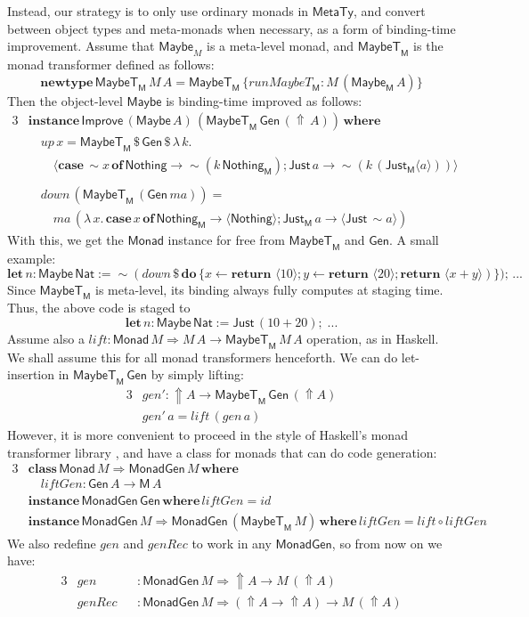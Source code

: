 \documentclass[acmsmall,screen,review,anonymous]{acmart}
\newcommand{\mit}[1]{\mathit{#1}}
\newcommand{\msf}[1]{\mathsf{#1}}
\newcommand{\mbf}[1]{\mathbf{#1}}
\newcommand{\bs}[1]{\boldsymbol{#1}}
\newcommand{\mdo}{\mbf{do}\,}
\newcommand{\ind}{\hspace{1em}}
\newcommand{\return}{\mbf{return}\,}
\newcommand{\lam}{\lambda\,}
\newcommand{\where}{\mbf{where}}
\newcommand{\M}{\msf{M}}
\newcommand{\of}{\mbf{of}\,}
\newcommand{\letdef}{\mbf{let\,}}
\newcommand{\vma}{\mit{ma}}
\newcommand{\Monad}{\msf{Monad}}
\newcommand{\fro}{\leftarrow}
\newcommand{\case}{\mbf{case\,}}
\newcommand{\Up}{{\Uparrow}}
\newcommand{\spl}{{\bs{\sim}}}
\newcommand{\ql}{{\bs{\langle}}}
\newcommand{\qr}{{\bs{\rangle}}}
\newcommand{\MTy}{\msf{MetaTy}}
\newcommand{\Nat}{\msf{Nat}}
\newcommand{\Maybe}{\msf{Maybe}}
\newcommand{\MaybeT}{\msf{MaybeT}}
\newcommand{\Nothing}{\msf{Nothing}}
\newcommand{\Just}{\msf{Just}}
\theoremstyle{remark}
\newcommand{\id}{\mit{id}}
\newcommand{\mup}{\mit{up}}
\newcommand{\mdown}{\mit{down}}
\newcommand{\tyclass}{\mbf{class}}
\newcommand{\instance}{\mbf{instance}\,}
\newcommand{\Improve}{\msf{Improve}}
\newcommand{\Gen}{\msf{Gen}}
\newcommand{\gen}{\mit{gen}}
\newcommand{\genRec}{\mit{genRec}}
\newcommand{\qt}[1]{\ql#1\qr}
\newcommand{\lift}{\mit{lift}}
\newcommand{\liftGen}{\mit{liftGen}}
\newcommand{\MonadGen}{\msf{MonadGen}}
\newcommand{\RA}{\Rightarrow}
\newcommand{\newtype}{\mbf{newtype}\,}
\newcommand{\runMaybeT}{\mit{runMaybeT}}
\newcommand{\dlr}{\,\$\,}
\begin{document}
Instead, our strategy is to only use ordinary monads in $\MTy$, and convert
between object types and meta-monads when necessary, as a form of binding-time
improvement. Assume that $\Maybe_M$ is a meta-level monad, and $\MaybeT_\M$ is
the monad transformer defined as follows:
\[ \newtype \MaybeT_\M\,M\,A = \MaybeT_\M\,\{\runMaybeT_\M : M\,(\Maybe_\M\,A)\} \]
Then the object-level $\Maybe$ is binding-time improved as follows:
\begin{alignat*}{3}
  &\instance \Improve\,(\Maybe\,A)\,(\MaybeT_\M\,\Gen\,(\Up\,A))\,\where\\
  &\ind \mup\,x = \MaybeT_\M \dlr \Gen \dlr \lam k.\\
  &\ind\ind \qt{\case \spl x\,\of \Nothing \to \spl(k\,\Nothing_\M);\Just\,a \to \spl(k\,(\Just_\M\qt{a}))}\\
  &\\
  &\ind \mdown\,(\MaybeT_\M\,(\Gen\,\vma)) = \\
  &\ind\ind \vma\,(\lam x.\,\case x\,\of \Nothing_\M \to \qt{\Nothing}; \Just_\M\,a \to \qt{\Just\,\spl a})
\end{alignat*}
With this, we get the $\Monad$ instance for free from $\MaybeT_\M$ and $\Gen$. A small example:
\[ \letdef n : \Maybe\,\Nat := \spl(\mdown\,\$\,\mdo \{x \fro \return\,\qt{10}; y \fro \return\,\qt{20}; \return\,\qt{x + y})\});\,... \]
Since $\MaybeT_\M$ is meta-level, its binding always fully computes at staging time. Thus, the above code is staged to
\[ \letdef n : \Maybe\,\Nat := \Just\,(10 + 20);\;... \]
Assume also a $\lift : \Monad\,M \RA M\,A \to \MaybeT_\M\,M\,A$ operation, as in
Haskell. We shall assume this for all monad transformers henceforth. We can do
let-insertion in $\MaybeT_\M\,\Gen$ by simply lifting:
\begin{alignat*}{3}
  &\gen' : \Up A \to \MaybeT_\M\,\Gen\,(\Up A) \\
  &\gen'\,a = \lift\,(\gen\,a)
\end{alignat*}
However, it is more convenient to proceed in the style of Haskell's monad
transformer library \cite{TODO}, and have a class for monads that can do code
generation:
\begin{alignat*}{3}
&\tyclass\,\Monad\,M \RA \MonadGen\,M\,\where\\
&\ind \liftGen : \Gen\,A \to \M\,A\\
&\instance \MonadGen\,\Gen\,\where\,\liftGen = \id \\
&\instance \MonadGen\,M \RA \MonadGen\,(\MaybeT_\M\,M)\,\where\,\liftGen = \lift \circ \liftGen
\end{alignat*}
We also redefine $\gen$ and $\genRec$ to work in any $\MonadGen$, so from now on we have:
\begin{alignat*}{3}
 & \gen   &&: \MonadGen\,M \RA \Up A \to M\,(\Up A)\\
 &\genRec &&: \MonadGen\,M \RA (\Up A \to \Up A) \to M\,(\Up A)
\end{alignat*}
\end{document}
